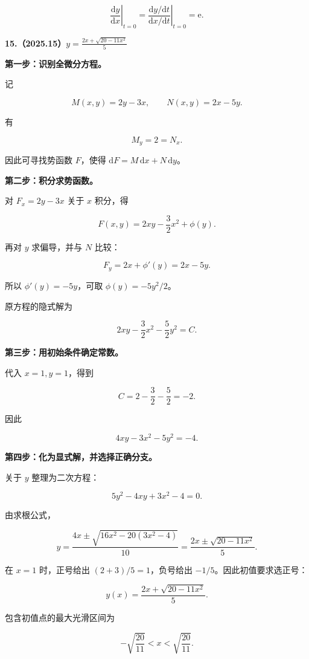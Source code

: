 \documentclass[UTF8,11pt,fontset=windows]{ctexart}
\begin{document}
$$
\boxed{\left.\frac{\mathrm dy}{\mathrm dx}\right|_{t=0}
=\left.\frac{\mathrm dy/\mathrm dt}{\mathrm dx/\mathrm dt}\right|_{t=0}
=\mathrm e}.
$$

\clearpage

\textbf{15.（2025.15）$\displaystyle y=\frac{2x+\sqrt{20-11x^2}}5$}

\textbf{第一步：识别全微分方程。}

记

$$
M(x,y)=2y-3x,\qquad N(x,y)=2x-5y.
$$

有

$$
M_y=2=N_x.
$$

因此可寻找势函数 $F$，使得 $\mathrm dF=M\,\mathrm dx+N\,\mathrm dy$。

\textbf{第二步：积分求势函数。}

对 $F_x=2y-3x$ 关于 $x$ 积分，得

$$
F(x,y)=2xy-\frac32x^2+\phi(y).
$$

再对 $y$ 求偏导，并与 $N$ 比较：

$$
F_y=2x+\phi'(y)=2x-5y.
$$

所以 $\phi'(y)=-5y$，可取 $\phi(y)=-5y^2/2$。

原方程的隐式解为

$$
2xy-\frac32x^2-\frac52y^2=C.
$$

\textbf{第三步：用初始条件确定常数。}

代入 $x=1,y=1$，得到

$$
C=2-\frac32-\frac52=-2.
$$

因此

$$
4xy-3x^2-5y^2=-4.
$$

\textbf{第四步：化为显式解，并选择正确分支。}

关于 $y$ 整理为二次方程：

$$
5y^2-4xy+3x^2-4=0.
$$

由求根公式，

$$
y=\frac{4x\pm\sqrt{16x^2-20(3x^2-4)}}{10}
=\frac{2x\pm\sqrt{20-11x^2}}5.
$$

在 $x=1$ 时，正号给出 $(2+3)/5=1$，负号给出 $-1/5$。因此初值要求选正号：

$$
\boxed{y(x)=\frac{2x+\sqrt{20-11x^2}}5}.
$$

包含初值点的最大光滑区间为

$$
-\sqrt{\frac{20}{11}}<x<\sqrt{\frac{20}{11}}.
$$

\clearpage
\end{document}
